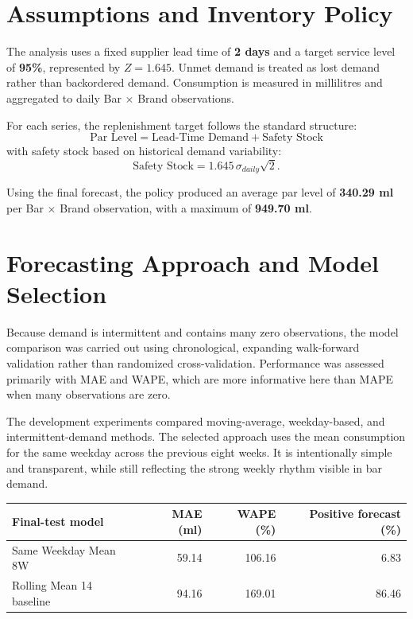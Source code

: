 \documentclass[11pt,a4paper]{article}
\begin{document}
\section{Assumptions and Inventory Policy}

The analysis uses a fixed supplier lead time of \textbf{2 days} and a target service level of \textbf{95\%}, represented by $Z=1.645$. Unmet demand is treated as lost demand rather than backordered demand. Consumption is measured in millilitres and aggregated to daily Bar $\times$ Brand observations.

For each series, the replenishment target follows the standard structure:
\[
\text{Par Level}=\text{Lead-Time Demand}+\text{Safety Stock}
\]
with safety stock based on historical demand variability:
\[
\text{Safety Stock}=1.645\,\sigma_{daily}\sqrt{2}.
\]

Using the final forecast, the policy produced an average par level of \textbf{340.29 ml} per Bar $\times$ Brand observation, with a maximum of \textbf{949.70 ml}.

\section{Forecasting Approach and Model Selection}

Because demand is intermittent and contains many zero observations, the model comparison was carried out using chronological, expanding walk-forward validation rather than randomized cross-validation. Performance was assessed primarily with MAE and WAPE, which are more informative here than MAPE when many observations are zero.

The development experiments compared moving-average, weekday-based, and intermittent-demand methods. The selected approach uses the mean consumption for the same weekday across the previous eight weeks. It is intentionally simple and transparent, while still reflecting the strong weekly rhythm visible in bar demand.

\begin{center}
\small
\begin{tabularx}{0.92\textwidth}{@{}Yrrr@{}}
\toprule
\textbf{Final-test model} & \textbf{MAE (ml)} & \textbf{WAPE (\%)} & \textbf{Positive forecast (\%)}\\
\midrule
Same Weekday Mean 8W & 59.14 & 106.16 & 6.83\\
Rolling Mean 14 baseline & 94.16 & 169.01 & 86.46\\
\bottomrule
\end{tabularx}
\end{center}
\end{document}
